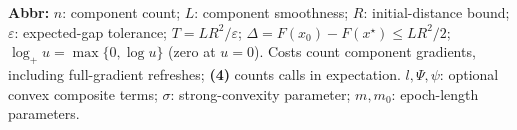 \begin{table}[tp]
\begin{threeparttable}
\begin{tablenotes}[flushleft]
\item[] \textbf{Abbr:} $n$: component count; $L$: component smoothness; $R$: initial-distance bound; $\varepsilon$: expected-gap tolerance; $T=LR^2/\varepsilon$; $\Delta=F(x_0)-F(x^\star)\le LR^2/2$; $\log_+u=\max\{0,\log u\}$ (zero at $u=0$). Costs count component gradients, including full-gradient refreshes; \textbf{(4)} counts calls in expectation. $l,\Psi,\psi$: optional convex composite terms; $\sigma$: strong-convexity parameter; $m,m_0$: epoch-length parameters.
\end{tablenotes}
\end{threeparttable}
\end{table}
\clearpage
